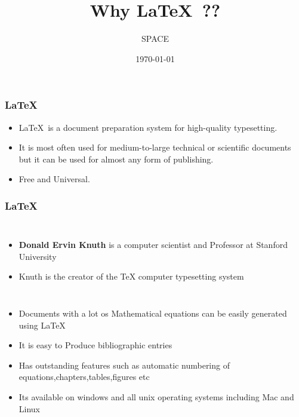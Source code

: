 \documentclass{beamer}
\title{Why \LaTeX \ ??}
\author{SPACE}
\date{\today}
\begin{document}
\maketitle

\begin{frame}
\frametitle{\LaTeX}
\begin{itemize}
\item \LaTeX\ is a document preparation system for high-quality typesetting.
\item  It is most often used for medium-to-large technical or scientific documents but it can be used for almost any form of publishing.
\item Free and Universal.
\end{itemize}
\end{frame}

\begin{frame}
\frametitle{\LaTeX}
\begin{columns}[c]
\column{1.5in}
\begin{itemize}
\item \textbf{Donald Ervin Knuth} is a computer scientist and Professor at Stanford University
\item Knuth is the creator of the TeX computer typesetting system
\end{itemize}
\column{1.5in}
\end{columns}
\end{frame}

\begin{frame}
\begin{itemize}
\item Documents with a lot os Mathematical equations can be easily generated using \LaTeX
\item It is easy to Produce bibliographic entries
\item Has outstanding features such as automatic numbering of equations,chapters,tables,figures etc
\item Its available on windows and all unix operating systems including Mac and Linux
\end{itemize}
\end{frame}
\end{document}
